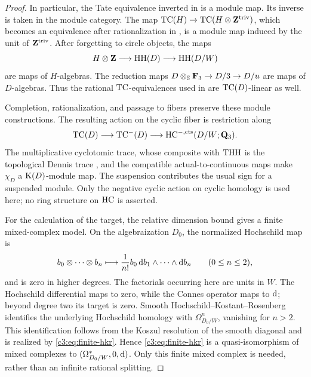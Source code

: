 \begin{proof}
In particular, the Tate equivalence inverted in
\cite[Corollary~2.10]{AMMN} is a module map.
Its inverse is taken in the module category.
The map
$\operatorname{TC}(H)\to\operatorname{TC}(H\otimes\mathbf{Z}^{\mathrm{triv}})$, which becomes an equivalence after
rationalization in \cite[Theorem~2.12]{AMMN}, is a module map induced
by the unit of $\mathbf{Z}^{\mathrm{triv}}$.
After forgetting to circle objects, the maps
\[
 H\otimes\mathbf{Z}\longrightarrow\operatorname{HH}(D)
       \longrightarrow\operatorname{HH}(D/W)
\]
are maps of $H$-algebras.
The reduction maps
$D\otimes_{\mathbb{S}}\mathbf{F}_3\to D/3\to D/u$ are maps of $D$-algebras.
Thus the rational $\operatorname{TC}$-equivalences used in
\cite[Definition~2.14 and Proposition~4.10]{AMMN} are
$\operatorname{TC}(D)$-linear as well.

Completion, rationalization, and passage to fibers preserve these
module constructions. The resulting action on the cyclic fiber is
restriction along
\[
 \operatorname{TC}(D)\longrightarrow\operatorname{TC}^-(D)
       \longrightarrow\operatorname{HC}^{-,\mathrm{cts}}(D/W;\mathbf{Q}_3).
\]
The multiplicative cyclotomic trace, whose composite with $\operatorname{THH}$ is
the topological Dennis trace
\cite[Theorems~7.3 and~7.4]{BGTTrace}, and the compatible
actual-to-continuous maps make $\chi_D$ a $\operatorname{K}(D)$-module map.
The suspension contributes the usual sign for a suspended module.
Only the negative cyclic action on cyclic homology is used here;
no ring structure on $\operatorname{HC}$ is asserted.

For the calculation of the target, the relative dimension bound gives
a finite mixed-complex model. On the algebraization $D_0$, the
normalized Hochschild map is
\begin{equation}\label{c3:eq:finite-hkr}
 b_0\otimes\cdots\otimes b_n
   \longmapsto
   \frac{1}{n!}b_0\,\mathrm{d} b_1\wedge\cdots\wedge\mathrm{d} b_n
   \qquad(0\leq n\leq2),
\end{equation}
and is zero in higher degrees.
The factorials occurring here are units in $W$.
The Hochschild differential maps to zero, while the Connes operator
maps to $\mathrm{d}$; beyond degree two its target is zero.
Smooth Hochschild--Kostant--Rosenberg identifies the underlying
Hochschild homology with $\Omega^n_{D_0/W}$, vanishing for $n>2$.
This identification follows from the Koszul resolution of the smooth
diagonal and is realized by \eqref{c3:eq:finite-hkr}.
Hence \eqref{c3:eq:finite-hkr} is a quasi-isomorphism of mixed complexes
to $(\Omega^\ast_{D_0/W},0,\mathrm{d})$.
Only this finite mixed complex is needed, rather than an infinite
rational splitting.


\end{proof}
